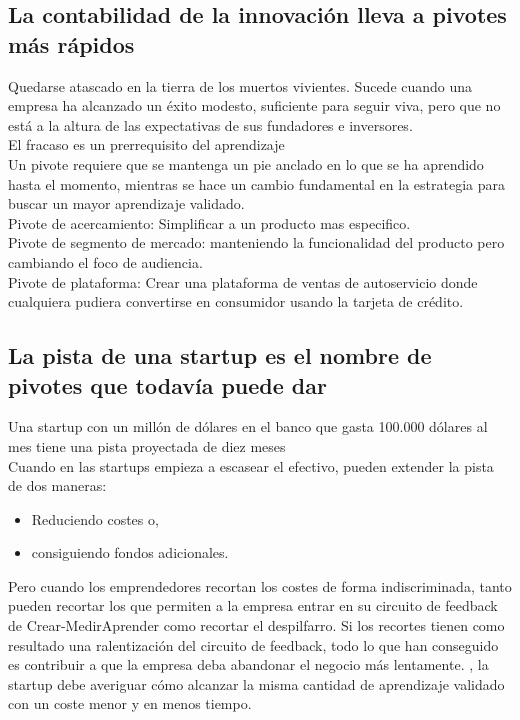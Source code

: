 \documentclass[10pt]{article}
\begin{document}
\begin{multicols}{2}
\subsection*{La contabilidad de la innovación lleva a pivotes más rápidos}
Quedarse atascado en la tierra de los muertos vivientes. Sucede cuando una empresa ha alcanzado un éxito modesto, suficiente para seguir viva, pero que no está a la altura de las expectativas de sus fundadores e inversores.\\
{\color{blue}El fracaso es un prerrequisito del aprendizaje\\
Un pivote requiere que se mantenga un pie anclado en lo que se ha aprendido hasta el momento, mientras se hace un cambio fundamental en la estrategia para buscar un mayor aprendizaje validado.}\\
{\color{red}Pivote de acercamiento: Simplificar a un producto mas especifico.\\
 Pivote de segmento de mercado: manteniendo la funcionalidad del producto pero cambiando el foco de audiencia.\\
Pivote de plataforma: Crear una plataforma de ventas de autoservicio donde cualquiera pudiera convertirse en consumidor usando la tarjeta de crédito.}
\subsection*{La pista de una startup es el nombre de pivotes que todavía puede dar}
{\color{blue}Una startup con un millón de dólares en el banco que gasta 100.000 dólares al mes tiene una pista proyectada de diez meses\\
Cuando en las startups empieza a escasear el efectivo, pueden extender la pista de dos maneras:
\begin{itemize}
\item Reduciendo costes o,
\item consiguiendo fondos adicionales.
\end{itemize}}
Pero cuando los emprendedores recortan los costes de forma indiscriminada, tanto pueden recortar los que permiten a la empresa entrar en su circuito de feedback de Crear-MedirAprender como recortar el despilfarro. Si los recortes tienen como resultado una ralentización del circuito de feedback, todo lo que han conseguido es contribuir a que la empresa deba abandonar el negocio más lentamente.
{\color{blue}, la startup debe averiguar cómo alcanzar la misma cantidad de aprendizaje validado con un coste menor y en menos tiempo.}

\end{multicols}
\end{document}
